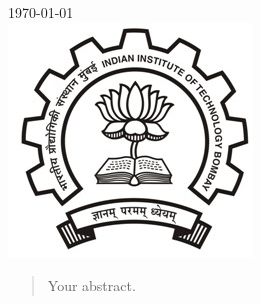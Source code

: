 \documentclass[12pt]{article}
\begin{document}
\begin{titlepage}

{\large \today}\\[1cm] %


\includegraphics[scale=2]{logo.jpg}\\[2cm] %
 

\vfill %

\end{titlepage}


\begin{abstract}
Your abstract.
\end{abstract}



\end{document}

